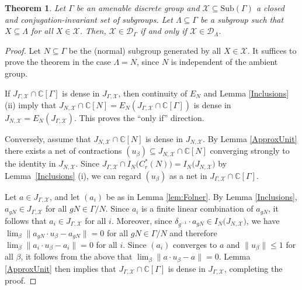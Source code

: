 \documentclass[11pt, oneside, reqno]{amsart}
\newtheorem{thm}{Theorem}[section]
\theoremstyle{definition}
\theoremstyle{remark}
\numberwithin{equation}{section}
\begin{document}
\begin{thm}
\label{thm:reducetonsg}
    Let $\Gamma$ be an amenable discrete group and $\mathcal{X} \subseteq \mathrm{Sub}(\Gamma)$ a closed and conjugation-invariant set of subgroups. Let $\Lambda \subseteq \Gamma$ be a subgroup such that $X \subseteq \Lambda$ for all $X \in \mathcal{X}$. Then, $\mathcal{X}\in\mathcal{D}_{\Gamma}$ if and only if $\mathcal{X}\in \mathcal{D}_{\Lambda}$.
\end{thm}

\begin{proof}
    Let $N \subseteq \Gamma$ be the (normal) subgroup generated by all $X\in\mathcal{X}$. It suffices to prove the theorem in the case $\Lambda = N$, since $N$ is independent of the ambient group.
    
    If $J_{\Gamma,\mathcal{X}}\cap\mathbb{C}[\Gamma]$ is dense in $J_{\Gamma,\mathcal{X}}$, then continuity of $E_{N}$ and Lemma \ref{Inclusions} (ii) imply that $J_{N,\mathcal{X}}\cap\mathbb{C}[N] = E_{N}(J_{\Gamma,\mathcal{X}}\cap\mathbb{C}[\Gamma])$ is dense in $J_{N,\mathcal{X}} = E_{N}(J_{\Gamma,\mathcal{X}})$. This proves the ``only if'' direction.

    Conversely, assume that $J_{N, \mathcal{X}}\cap\mathbb{C}[N]$ is dense in $J_{N,\mathcal{X}}$. By Lemma \ref{ApproxUnit} there exists a net of contractions $(u_{\beta})\subseteq J_{N,\mathcal{X}}\cap\mathbb{C}[N]$ converging strongly to the identity in $J_{N,\mathcal{X}}$. Since $J_{\Gamma,\mathcal{X}}\cap I_N\big( C^{*}_{r}(N) \big) = I_N \big(J_{N,\mathcal{X}} \big)$ by Lemma~\ref{Inclusions} (i), we can regard $(u_{\beta})$ as a net in $J_{\Gamma,\mathcal{X}}\cap\mathbb{C}[\Gamma]$.
    
    Let $a\in J_{\Gamma,\mathcal{X}}$, and let $(a_{i})$ be as in Lemma \ref{lem:Folner}. By Lemma \ref{Inclusions}, $a_{gN}\in J_{\Gamma,\mathcal{X}}$ for all $gN\in \Gamma/N$. Since $a_{i}$ is a finite linear combination of $a_{gN}$, it follows that $a_{i}\in J_{\Gamma,\mathcal{X}}$ for all $i$. Moreover, since $\delta_{g^{-1}} \cdot a_{gN}\in I_N\big(J_{N,\mathcal{X}}\big)$, we have $\lim_{\beta}\|a_{gN} \cdot u_{\beta} - a_{gN}\| = 0$ for all $gN\in\Gamma/N$ and therefore $\lim_{\beta}\|a_{i} \cdot u_{\beta} - a_{i}\| = 0$ for all $i$. Since $(a_{i})$ converges to $a$ and $\|u_{\beta}\|\leq 1$ for all $\beta$, it follows from the above that $\lim_{\beta}\|a \cdot u_{\beta} - a\| = 0$. Lemma \ref{ApproxUnit} then implies that $J_{\Gamma, \mathcal{X}}\cap\mathbb{C}[\Gamma]$ is dense in $J_{\Gamma,\mathcal{X}}$, completing the proof.
\end{proof}
\end{document}
